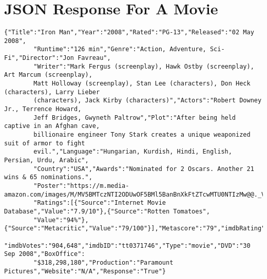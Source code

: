 \documentclass[12pt]{report}
\begin{document}
\chapter{JSON Response For A Movie }
    \begin{lstlisting}[gobble=8, tabsize=4,caption=JSON returned from request for Iron Man 2008,label=fig:ironmanjson]
        {"Title":"Iron Man","Year":"2008","Rated":"PG-13","Released":"02 May 2008",
        "Runtime":"126 min","Genre":"Action, Adventure, Sci-Fi","Director":"Jon Favreau",
        "Writer":"Mark Fergus (screenplay), Hawk Ostby (screenplay), Art Marcum (screenplay), 
        Matt Holloway (screenplay), Stan Lee (characters), Don Heck (characters), Larry Lieber 
        (characters), Jack Kirby (characters)","Actors":"Robert Downey Jr., Terrence Howard, 
        Jeff Bridges, Gwyneth Paltrow","Plot":"After being held captive in an Afghan cave, 
        billionaire engineer Tony Stark creates a unique weaponized suit of armor to fight 
        evil.","Language":"Hungarian, Kurdish, Hindi, English, Persian, Urdu, Arabic",
        "Country":"USA","Awards":"Nominated for 2 Oscars. Another 21 wins & 65 nominations.",
        "Poster":"https://m.media-amazon.com/images/M/MV5BMTczNTI2ODUwOF5BMl5BanBnXkFtZTcwMTU0NTIzMw@@._V1_SX300.jpg",
        "Ratings":[{"Source":"Internet Movie Database","Value":"7.9/10"},{"Source":"Rotten Tomatoes",
        "Value":"94%"},{"Source":"Metacritic","Value":"79/100"}],"Metascore":"79","imdbRating":"7.9",
        "imdbVotes":"904,648","imdbID":"tt0371746","Type":"movie","DVD":"30 Sep 2008","BoxOffice":
        "$318,298,180","Production":"Paramount Pictures","Website":"N/A","Response":"True"}                
    \end{lstlisting}

 

\end{document}
